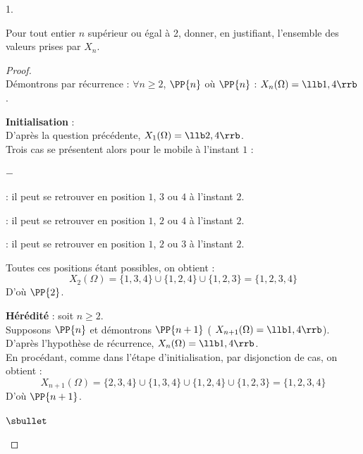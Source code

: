\begin{noliste}{1.}
  \newpage


\item Pour tout entier $n$ supérieur ou égal à 2, donner, en
  justifiant, l'ensemble des valeurs prises par $X_{n}$.

  \begin{proof}~\\%
    Démontrons par récurrence : $\forall n \geq 2$, $\PP{n}$ \quad
    où \quad $\PP{n}$ : $X_n(\Omega) = \llb 1, 4\rrb$.
    \begin{noliste}{\fitem}
    \item {\bf Initialisation} :\\
      D'après la question précédente, $X_1(\Omega) = \llb 2,
      4\rrb$.\\
      Trois cas se présentent alors pour le mobile à l'instant $1$ :
      \begin{noliste}{$-$}
      \item {} : il peut se
        retrouver en position $1$, $3$ ou $4$ à l'instant $2$.
      \item {} : il peut se
        retrouver en position $1$, $2$ ou $4$ à l'instant $2$.
      \item {} : il peut se
        retrouver en position $1$, $2$ ou $3$ à l'instant $2$.        
      \end{noliste}
      Toutes ces positions étant possibles, on obtient :
      \[
      X_2(\Omega) = \{1, 3, 4\} \cup \{1, 2, 4\} \cup \{1, 2, 3\} =
      \{1, 2, 3, 4\}
      \]
      D'où $\PP{2}$.
    \item {\bf Hérédité} : soit $n \geq 2$.\\
      Supposons $\PP{n}$ et démontrons $\PP{n+1}$ (\ie
      $X_{n+1}(\Omega) = \llb 1, 4\rrb$).\\[.2cm]
      D'après l'hypothèse de récurrence, $X_n(\Omega) = \llb 1, 4
      \rrb$. \\
      En procédant, comme dans l'étape d'initialisation, par
      disjonction de cas, on obtient :
      \[
      X_{n+1}(\Omega) = \{2, 3, 4\} \cup \{1, 3, 4\} \cup \{1, 2, 4\}
      \cup \{1, 2, 3\} = \{1, 2, 3, 4\}
      \]
      D'où $\PP{n+1}$.
    \end{noliste}
    \begin{remark}%
      \begin{noliste}{$\sbullet$}

\end{noliste}
\end{remark}
\end{proof}
\end{noliste}

